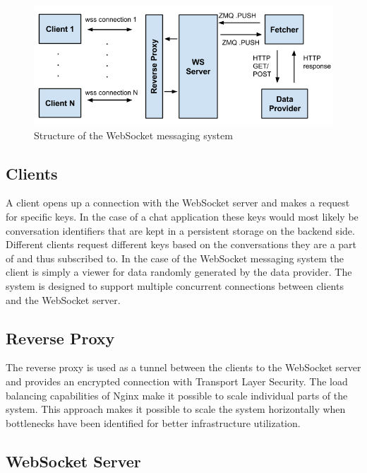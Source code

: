 \begin{figure}[h!]
	\centering
	\label{fig:webSocketMessagingSystem}\includegraphics[width=1\textwidth]{images/websocketMessagingSystem}
	\caption{Structure of the WebSocket messaging system}
\end{figure}

\subsection{Clients}

A client opens up a connection with the WebSocket server and makes a request for specific keys. In the case of a chat application these keys would most likely be conversation identifiers that are kept in a persistent storage on the backend side. Different clients request different keys based on the conversations they are a part of and thus subscribed to. In the case of the WebSocket messaging system the client is simply a viewer for data randomly generated by the data provider. The system is designed to support multiple concurrent connections between clients and the WebSocket server.

\subsection{Reverse Proxy}

The reverse proxy is used as a tunnel between the clients to the WebSocket server and provides an encrypted connection with Transport Layer Security. The load balancing capabilities of Nginx make it possible to scale individual parts of the system. This approach makes it possible to scale the system horizontally when bottlenecks have been identified for better infrastructure utilization.


\subsection{WebSocket Server}

